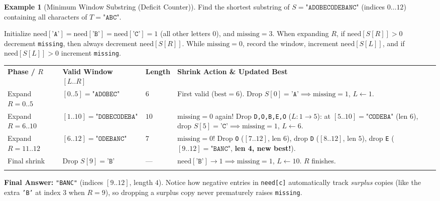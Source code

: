 \documentclass[11pt,a4paper]{article}
\theoremstyle{definition}
\newtheorem{example}{Example}[section]
\begin{document}
\begin{example}[Minimum Window Substring (Deficit Counter)]
Find the shortest substring of $S = \texttt{"ADOBECODEBANC"}$ (indices $0 \dots 12$) containing all characters of $T = \texttt{"ABC"}$.

Initialize $\text{need}[\texttt{'A'}] = \text{need}[\texttt{'B'}] = \text{need}[\texttt{'C'}] = 1$ (all other letters $0$), and $\text{missing} = 3$. When expanding $R$, if $\text{need}[S[R]] > 0$ decrement \texttt{missing}, then always decrement $\text{need}[S[R]]$. While $\text{missing} = 0$, record the window, increment $\text{need}[S[L]]$, and if $\text{need}[S[L]] > 0$ increment \texttt{missing}.

\begingroup\footnotesize{}
\begin{tabularx}{\textwidth}{>{\raggedright\arraybackslash}p{2.3cm} >{\raggedright\arraybackslash}p{3.0cm} >{\centering\arraybackslash}p{1.3cm} >{\raggedright\arraybackslash}X}
\arrayrulecolor{primaryblue}\toprule[1.1pt]
\rowcolor{primaryblue!10}
\textcolor{primaryblue}{\textbf{Phase / $R$}} & \textcolor{primaryblue}{\textbf{Valid Window $[L..R]$}} & \textcolor{primaryblue}{\textbf{Length}} & \textcolor{primaryblue}{\textbf{Shrink Action \& Updated Best}} \\
\arrayrulecolor{codeframe}\midrule[0.6pt]
Expand $R = 0..5$ & $[0..5] = \texttt{"ADOBEC"}$ & $6$ & First valid ($\text{best} = 6$). Drop $S[0]{=}\texttt{'A'} \implies \text{missing} = 1$, $L \leftarrow 1$. \\
Expand $R = 6..10$ & $[1..10] = \texttt{"DOBECODEBA"}$ & $10$ & $\text{missing} = 0$ again! Drop \texttt{D,O,B,E,O} ($L: 1 \to 5$): at $[5..10] = \texttt{"CODEBA"}$ (len $6$), drop $S[5]{=}\texttt{'C'} \implies \text{missing} = 1$, $L \leftarrow 6$. \\
Expand $R = 11..12$ & $[6..12] = \texttt{"ODEBANC"}$ & $7$ & $\text{missing} = 0$! Drop \texttt{O} ($[7..12]$, len $6$), drop \texttt{D} ($[8..12]$, len $5$), drop \texttt{E} ($[9..12] = \texttt{"BANC"}$, \textbf{len 4, new best!}). \\
Final shrink & Drop $S[9]{=}\texttt{'B'}$ & --- & $\text{need}[\texttt{'B'}] \to 1 \implies \text{missing} = 1$, $L \leftarrow 10$. $R$ finishes. \\
\arrayrulecolor{primaryblue}\bottomrule[1.1pt]
\end{tabularx}\endgroup

\textbf{Final Answer:} \texttt{"BANC"} (indices $[9..12]$, length $4$). Notice how negative entries in \texttt{need[c]} automatically track \emph{surplus} copies (like the extra \texttt{'B'} at index $3$ when $R = 9$), so dropping a surplus copy never prematurely raises \texttt{missing}.
\end{example}
\end{document}
